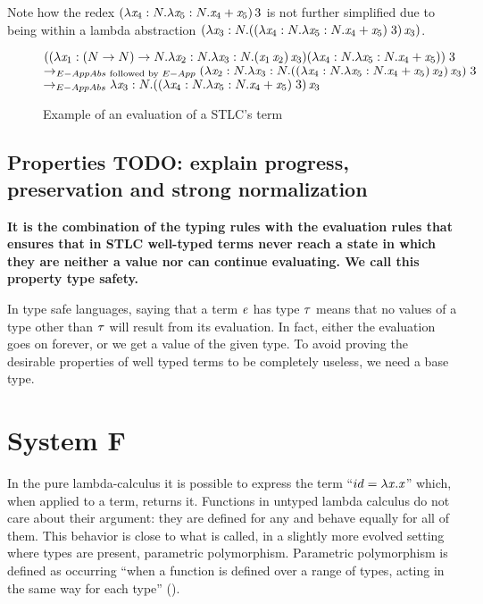 Note how the redex $(\lambda \mathit{x}_4:N. \lambda \mathit{x}_5:N. \mathit{x}_4 + \mathit{x}_5) \, 3$ is not further simplified due to being within a lambda abstraction $(\lambda \mathit{x}_3: N. ((\lambda \mathit{x}_4:N. \lambda \mathit{x}_5:N. \mathit{x}_4 + \mathit{x}_5) \; 3)\,\mathit{x}_3 )$.
\begin{figure}
    $((\lambda \mathit{x}_1: (N \rightarrow N)\rightarrow N.\lambda \mathit{x}_2:N.\lambda \mathit{x}_3: N . (\mathit{x}_1 \, \mathit{x}_2)\,\mathit{x}_3) (\lambda \mathit{x}_4:N. \lambda \mathit{x}_5:N. \mathit{x}_4 + \mathit{x}_5))\;3$
    \\
$\rightarrow_{E-AppAbs\text{ followed by }E-App}(\lambda \mathit{x}_2:N.\lambda \mathit{x}_3: N. ((\lambda \mathit{x}_4:N. \lambda \mathit{x}_5:N. \mathit{x}_4 + \mathit{x}_5) \, \mathit{x}_2)\,\mathit{x}_3)\; 3 $\\
    $\rightarrow_{E-AppAbs}\lambda \mathit{x}_3: N. ((\lambda \mathit{x}_4:N. \lambda \mathit{x}_5:N. \mathit{x}_4 + \mathit{x}_5) \; 3)\,\mathit{x}_3 $

  \caption{Example of an evaluation of a STLC's term}
  \label{stlcexeval}
\end{figure}
\subsection{Properties TODO: explain progress, preservation and strong normalization}
\textbf{It is the combination of the typing rules with the evaluation rules that ensures that in STLC well-typed terms never reach a state in which they are neither a value nor can continue evaluating. We call this property type safety.}

In type safe languages, saying that a term $\mathit{e}$ has type $\mathit{\tau}$ means that no values of a type other than $\mathit{\tau}$ will result from its evaluation. In fact, either the evaluation goes on forever, or we get a value of the given type. To avoid proving the desirable properties of well typed terms to be completely useless, we need a base type.
\section{System F}
\label{2.3}
In the pure lambda-calculus it is possible to express the term ``$id=\lambda\mathit{x}.\mathit{x}$'' which, when applied to a term, returns it. Functions in untyped lambda calculus do not care about their argument: they are defined for any and behave equally for all of them. This behavior is close to what is called, in a slightly more evolved setting where types are present, parametric polymorphism. Parametric polymorphism is defined as occurring ``when a function is defined over a range of types, acting in the same way for each type'' (\cite{adhoc}).

